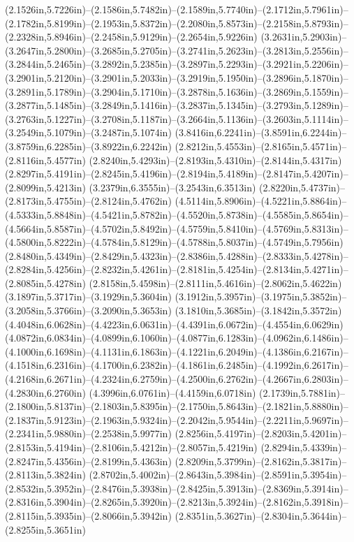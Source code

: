 (2.1526in,5.7226in)--(2.1586in,5.7482in)--(2.1589in,5.7740in)--(2.1712in,5.7961in)--(2.1782in,5.8199in)--(2.1953in,5.8372in)--(2.2080in,5.8573in)--(2.2158in,5.8793in)--(2.2328in,5.8946in)--(2.2458in,5.9129in)--(2.2654in,5.9226in) (3.2631in,5.2903in)--(3.2647in,5.2800in)--(3.2685in,5.2705in)--(3.2741in,5.2623in)--(3.2813in,5.2556in)--(3.2844in,5.2465in)--(3.2892in,5.2385in)--(3.2897in,5.2293in)--(3.2921in,5.2206in)--(3.2901in,5.2120in)--(3.2901in,5.2033in)--(3.2919in,5.1950in)--(3.2896in,5.1870in)--(3.2891in,5.1789in)--(3.2904in,5.1710in)--(3.2878in,5.1636in)--(3.2869in,5.1559in)--(3.2877in,5.1485in)--(3.2849in,5.1416in)--(3.2837in,5.1345in)--(3.2793in,5.1289in)--(3.2763in,5.1227in)--(3.2708in,5.1187in)--(3.2664in,5.1136in)--(3.2603in,5.1114in)--(3.2549in,5.1079in)--(3.2487in,5.1074in) (3.8416in,6.2241in)--(3.8591in,6.2244in)--(3.8759in,6.2285in)--(3.8922in,6.2242in) (2.8212in,5.4553in)--(2.8165in,5.4571in)--(2.8116in,5.4577in) (2.8240in,5.4293in)--(2.8193in,5.4310in)--(2.8144in,5.4317in) (2.8297in,5.4191in)--(2.8245in,5.4196in)--(2.8194in,5.4189in)--(2.8147in,5.4207in)--(2.8099in,5.4213in) (3.2379in,6.3555in)--(3.2543in,6.3513in) (2.8220in,5.4737in)--(2.8173in,5.4755in)--(2.8124in,5.4762in) (4.5114in,5.8906in)--(4.5221in,5.8864in)--(4.5333in,5.8848in)--(4.5421in,5.8782in)--(4.5520in,5.8738in)--(4.5585in,5.8654in)--(4.5664in,5.8587in)--(4.5702in,5.8492in)--(4.5759in,5.8410in)--(4.5769in,5.8313in)--(4.5800in,5.8222in)--(4.5784in,5.8129in)--(4.5788in,5.8037in)--(4.5749in,5.7956in) (2.8480in,5.4349in)--(2.8429in,5.4323in)--(2.8386in,5.4288in)--(2.8333in,5.4278in)--(2.8284in,5.4256in)--(2.8232in,5.4261in)--(2.8181in,5.4254in)--(2.8134in,5.4271in)--(2.8085in,5.4278in) (2.8158in,5.4598in)--(2.8111in,5.4616in)--(2.8062in,5.4622in) (3.1897in,5.3717in)--(3.1929in,5.3604in) (3.1912in,5.3957in)--(3.1975in,5.3852in)--(3.2058in,5.3766in)--(3.2090in,5.3653in) (3.1810in,5.3685in)--(3.1842in,5.3572in) (4.4048in,6.0628in)--(4.4223in,6.0631in)--(4.4391in,6.0672in)--(4.4554in,6.0629in) (4.0872in,6.0834in)--(4.0899in,6.1060in)--(4.0877in,6.1283in)--(4.0962in,6.1486in)--(4.1000in,6.1698in)--(4.1131in,6.1863in)--(4.1221in,6.2049in)--(4.1386in,6.2167in)--(4.1518in,6.2316in)--(4.1700in,6.2382in)--(4.1861in,6.2485in)--(4.1992in,6.2617in)--(4.2168in,6.2671in)--(4.2324in,6.2759in)--(4.2500in,6.2762in)--(4.2667in,6.2803in)--(4.2830in,6.2760in) (4.3996in,6.0761in)--(4.4159in,6.0718in) (2.1739in,5.7881in)--(2.1800in,5.8137in)--(2.1803in,5.8395in)--(2.1750in,5.8643in)--(2.1821in,5.8880in)--(2.1837in,5.9123in)--(2.1963in,5.9324in)--(2.2042in,5.9544in)--(2.2211in,5.9697in)--(2.2341in,5.9880in)--(2.2538in,5.9977in) (2.8256in,5.4197in)--(2.8203in,5.4201in)--(2.8153in,5.4194in)--(2.8106in,5.4212in)--(2.8057in,5.4219in) (2.8294in,5.4339in)--(2.8247in,5.4356in)--(2.8199in,5.4363in) (2.8209in,5.3799in)--(2.8162in,5.3817in)--(2.8113in,5.3824in) (2.8702in,5.4002in)--(2.8643in,5.3984in)--(2.8591in,5.3954in)--(2.8532in,5.3952in)--(2.8476in,5.3938in)--(2.8425in,5.3913in)--(2.8369in,5.3914in)--(2.8316in,5.3904in)--(2.8265in,5.3920in)--(2.8213in,5.3924in)--(2.8162in,5.3918in)--(2.8115in,5.3935in)--(2.8066in,5.3942in) (2.8351in,5.3627in)--(2.8304in,5.3644in)--(2.8255in,5.3651in) 